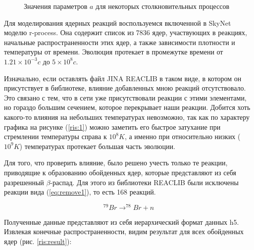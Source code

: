 \documentclass[%
master,    %
natbib,      %
subf,        %
href,        %
colorlinks,  %
]{disser}
\begin{document}
\begin{figure}
	\caption{Значения параметров $a$ для некоторых столкновительных процессов}
	\label{ris:a-4}
\end{figure}

Для моделирования ядерных реакций воспользуемся включенной в SkyNet моделю r-process. Она содержит список из 7836 ядер, участвующих в реакциях, начальные распространенности этих ядер, а также зависимости плотности и температуры от времени. Эволюция протекает в промежутке времени от $1.21\times 10^{-3}c$ до $5\times 10^8c$. 

Изначально, если оставлять файл JINA REACLIB в таком виде, в котором он присутствует в библиотеке, влияние добавленных мною реакций отсутствовало. Это связано с тем, что в сети уже присутствовали реакции с этими элементами, но гораздо большим сечением, которое перекрывает наши реакции. Добится хоть какого-то влияния на небольших температурах невозможно, так как по характеру графика на рисунке (\ref{ris:1}) можно заметить его быстрое затухание при стремлении температуры справа к $10^8 K$, а именно при относительно низких ($10^9 K$) температурах протекает большая часть эволюции.

Для того, что проверить влияние, было решено учесть только те реакции, приводящие к образованию обойденных ядер, которые представляют из себя разрешенный $\beta$-распад. Для этого из библиотеки REACLIB были исключены реакции вида (\ref{eq:remove1}), то есть 168 реакций.

\begin{equation}
\label{eq:remove1}
	^{79}Br \to ^{78}Br + n
\end{equation}

Полученные данные представляют из себя иерархический формат данных h5. Извлекая конечные распространенности, видим результат для всех обойденных ядер (рис. \ref{ris:result}):
\end{document}
